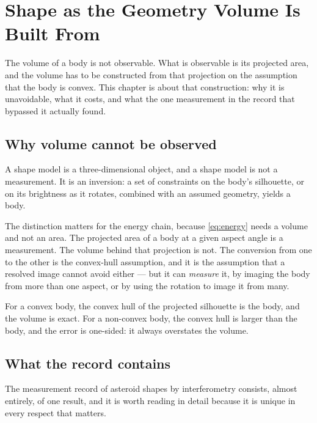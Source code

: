 
\chapter{Shape as the Geometry Volume Is Built From}
\label{ch:shape-geometry}

The volume of a body is not observable. What is observable is its projected
area, and the volume has to be constructed from that projection on the
assumption that the body is convex. This chapter is about that construction:
why it is unavoidable, what it costs, and what the one measurement in the
record that bypassed it actually found.

\section{Why volume cannot be observed}

A shape model is a three-dimensional object, and a shape model is not a
measurement. It is an inversion: a set of constraints on the body's
silhouette, or on its brightness as it rotates, combined with an assumed
geometry, yields a body.

The distinction matters for the energy chain, because \eqref{eq:energy} needs
a volume and not an area. The projected area of a body at a given aspect
angle is a measurement. The volume behind that projection is not. The
conversion from one to the other is the convex-hull assumption, and it is
the assumption that a resolved image cannot avoid either --- but it can
\emph{measure} it, by imaging the body from more than one aspect, or by
using the rotation to image it from many.

For a convex body, the convex hull of the projected silhouette is the body,
and the volume is exact. For a non-convex body, the convex hull is larger
than the body, and the error is one-sided: it always overstates the volume.

\section{What the record contains}

The measurement record of asteroid shapes by interferometry consists, almost
entirely, of one result, and it is worth reading in detail because it is
unique in every respect that matters.

